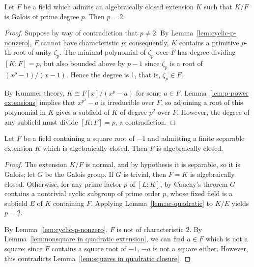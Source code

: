 \begin{lemma} \label{lem:ac-quadratic}
\leanok
Let $F$ be a field which admits an algebraically closed extension $K$ such that $K/F$ is Galois of prime degree $p$. Then $p = 2$.
\end{lemma}
\begin{proof}
\leanok
Suppose by way of contradiction that $p \neq 2$.
By Lemma~\ref{lem:cyclic-p-nonzero}, $F$ cannot have characteristic $p$;
consequently, $K$ contains a primitive $p$-th root of unity $\zeta_p$.
The minimal polynomial of $\zeta_p$ over $F$ has degree dividing $[K:F] = p$, but also bounded above by $p-1$ since $\zeta_p$ is a root of $(x^p-1)/(x-1)$. Hence the degree is 1, that is, $\zeta_p \in F$.

By Kummer theory, $K  \cong F[x]/(x^p-a)$ for some $a \in F$. 
Lemma~\ref{lem:p-power extensions} implies that $x^{p^2}-a$ is irreducible over $F$,
so adjoining a root of this polynomial in $K$ gives a subfield of $K$ of degree $p^2$ over $F$.
However, the degree of any subfield must divide $[K:F] = p$, a contradiction.
\end{proof}

\begin{lemma} \label{lem:ac-finite-sep-alg-closure-with-i}
\leanok
Let $F$ be a field containing a square root of $-1$ and admitting a finite separable extension $K$ which is algebraically closed. Then $F$ is algebraically closed.
\end{lemma}
\begin{proof}
\leanok
{}
The extension $K/F$ is normal, and by hypothesis it is separable, so it is Galois; let $G$ be the Galois group. 
If $G$ is trivial, then $F=K$ is algebraically closed.
Otherwise, for any prime factor $p$ of $[L:K]$, by Cauchy's theorem 
$G$ contains a nontrivial cyclic subgroup of prime order $p$, whose fixed field is a subfield $E$ of $K$ containing $F$.
Applying Lemma~\ref{lem:ac-quadratic} to $K/E$ yields $p=2$.

By Lemma~\ref{lem:cyclic-p-nonzero}, $F$ is not of characteristic $2$.
By Lemma~\ref{lem:nonsquare in quadratic extension}, we can find $a \in F$ which is not a square;
since $F$ contains a square root of $-1$, $-a$ is not a square either. 
However, this contradicts
Lemma~\ref{lem:squares in quadratic closure}.
\end{proof}

